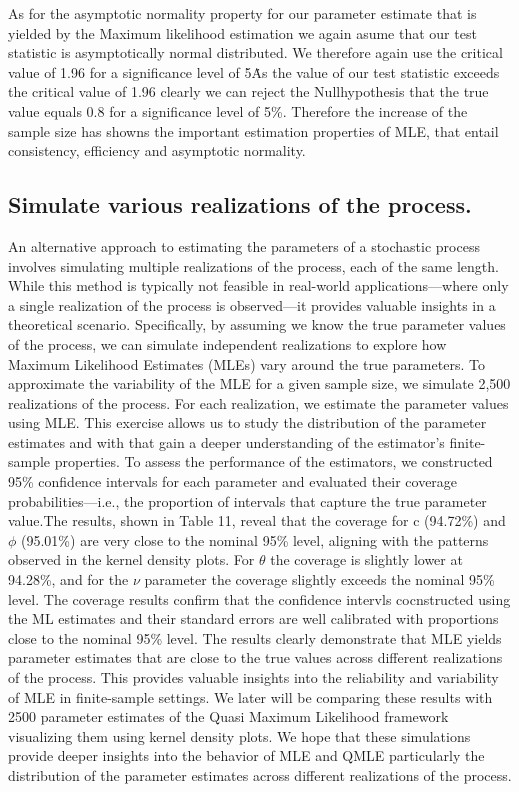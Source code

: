 \documentclass[12pt]{article}
\begin{document}
As for the asymptotic normality property for our parameter estimate that is yielded by the Maximum likelihood estimation we again asume that our test statistic is asymptotically normal distributed. We therefore again use the critical value of 1.96 for a significance level of 5\.%
As the value of our test statistic exceeds the critical value of 1.96 clearly we can reject the Nullhypothesis that the true value equals 0.8 for a significance level of 5\%.
Therefore the increase of the sample size has showns the important estimation properties of MLE, that entail consistency, efficiency and asymptotic normality.


\subsection{Simulate various realizations of the process.}
An alternative approach to estimating the parameters of a stochastic process involves simulating multiple realizations of the process, each of the same length. 
While this method is typically not feasible in real-world applications—where only a single realization of the process is observed—it provides valuable insights in a theoretical scenario. Specifically, by assuming we know the true parameter values of the process, we can simulate independent realizations to explore how Maximum Likelihood Estimates (MLEs) vary around the true parameters.
To approximate the variability of the MLE for a given sample size, we simulate 2,500 realizations of the process. For each realization, we estimate the parameter values using MLE. This exercise allows us to study the distribution of the parameter estimates and with that gain a deeper understanding of the estimator's finite-sample properties.
To assess the performance of the estimators, we constructed 95\% confidence intervals for each parameter and evaluated their coverage probabilities—i.e., the proportion of intervals that capture the true parameter value.The results, shown in Table 11, reveal that the coverage for 
c (94.72\%) and $\phi$ (95.01\%) are very close to the nominal 95\% level, aligning with the patterns observed in the kernel density plots. 
For $\theta$ the coverage is slightly lower at 94.28\%, and for the $\nu$ parameter the coverage slightly exceeds the nominal 95\% level.
The coverage results confirm that the confidence intervls cocnstructed using the ML estimates and their standard errors are well calibrated with proportions close to the nominal 95\% level.
The results clearly demonstrate that MLE yields parameter estimates that are close to the true values across different realizations of the process. This provides valuable insights into the reliability and variability of MLE in finite-sample settings.
We later will be comparing these results with 2500 parameter estimates of the Quasi Maximum Likelihood framework visualizing them using kernel density plots. We hope that these simulations provide deeper insights into the behavior of MLE and QMLE particularly the distribution of the parameter estimates across different realizations of the process.
\end{document}

